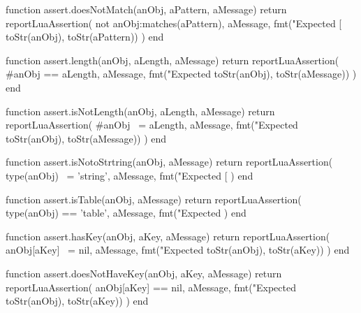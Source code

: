 \stopTestSuite


\startLuaCode
function assert.doesNotMatch(anObj, aPattern, aMessage)
  return reportLuaAssertion(
    not anObj:matches(aPattern),
    aMessage,
    fmt("Expected [%
      toStr(anObj), toStr(aPattern))
  )
end
\stopLuaCode

\stopTestSuite


\startLuaCode
function assert.length(anObj, aLength, aMessage)
  return reportLuaAssertion(
    #anObj == aLength,
    aMessage,
    fmt("Expected %
      toStr(anObj), toStr(aMessage))
  )
end
\stopLuaCode

\stopTestSuite


\startLuaCode
function assert.isNotLength(anObj, aLength, aMessage)
  return reportLuaAssertion(
    #anObj ~= aLength,
    aMessage,
    fmt("Expected %
      toStr(anObj), toStr(aMessage))
  )
end
\stopLuaCode

\stopTestSuite


\startLuaCode
function assert.isNotoStrtring(anObj, aMessage)
  return reportLuaAssertion(
    type(anObj) ~= 'string',
    aMessage,
    fmt("Expected [%
  )
end
\stopLuaCode

\stopTestSuite


\startLuaCode
function assert.isTable(anObj, aMessage)
  return reportLuaAssertion(
    type(anObj) == 'table',
    aMessage,
    fmt("Expected %
  )
end
\stopLuaCode

\stopTestSuite


\startLuaCode
function assert.hasKey(anObj, aKey, aMessage)
  return reportLuaAssertion(
    anObj[aKey] ~= nil,
    aMessage,
    fmt("Expected %
      toStr(anObj), toStr(aKey))
  )
end
\stopLuaCode

\stopTestSuite


\startLuaCode
function assert.doesNotHaveKey(anObj, aKey, aMessage)
  return reportLuaAssertion(
    anObj[aKey] == nil,
    aMessage,
    fmt("Expected %
      toStr(anObj), toStr(aKey))
  )
end
\stopLuaCode

